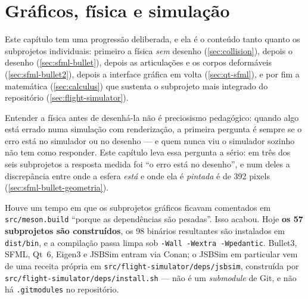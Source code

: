 
\section{Gráficos, física e simulação}
\label{sec:graficos}

Este capítulo tem uma progressão deliberada, e ela é o conteúdo tanto quanto os
subprojetos individuais: primeiro a física \emph{sem} desenho
(\ref{sec:collision}), depois o desenho (\ref{sec:sfml-bullet}), depois as
articulações e os corpos deformáveis (\ref{sec:sfml-bullet2}), depois a
interface gráfica em volta (\ref{sec:qt-sfml}), e por fim a matemática
(\ref{sec:calculus}) que sustenta o subprojeto mais integrado do repositório
(\ref{sec:flight-simulator}).

Entender a física antes de desenhá-la não é preciosismo pedagógico: quando algo
está errado numa simulação com renderização, a primeira pergunta é sempre se o
erro está no simulador ou no desenho --- e quem nunca viu o simulador sozinho
não tem como responder. Este capítulo leva essa pergunta a sério: em três dos
seis subprojetos a resposta medida foi ``o erro está no desenho'', e num deles a
discrepância entre onde a esfera \emph{está} e onde ela é \emph{pintada} é de
392 pixels (\cref{sec:sfml-bullet-geometria}).

\begin{regra}
Houve um tempo em que os subprojetos gráficos ficavam comentados em
\texttt{src/meson.build} ``porque as dependências são pesadas''. Isso acabou.
Hoje \textbf{os 57 subprojetos são construídos}, os 98 binários resultantes são
instalados em \texttt{dist/bin}, e a compilação passa limpa sob
\texttt{-Wall -Wextra -Wpedantic}. Bullet3, SFML, Qt~6, Eigen3 e JSBSim entram
via Conan; o JSBSim em particular vem de uma receita própria em
\texttt{src/flight-simulator/deps/jsbsim}, construída por
\texttt{src/flight-simulator/deps/install.sh} --- não é um \emph{submodule} de
Git, e não há \texttt{.gitmodules} no repositório.
\end{regra}

